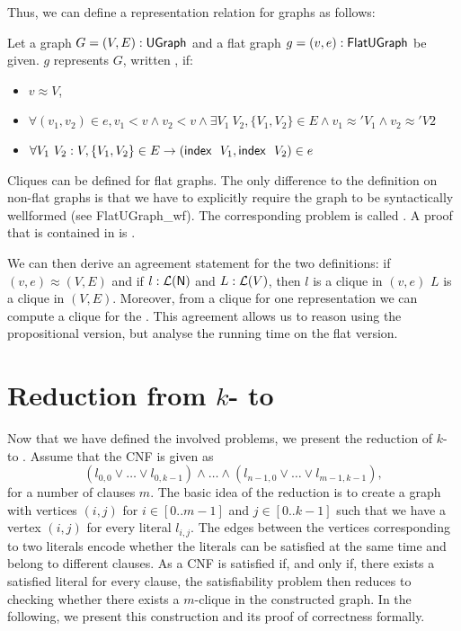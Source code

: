 Thus, we can define a representation relation for graphs as follows: 
\begin{definition}\label{def:graph_repr}
  Let a graph $G = (V, E) : \textsf{UGraph}$ and a flat graph $g = (v, e) : \textsf{FlatUGraph}$ be given. 
  $g$ represents $G$, written , if: 
  \begin{itemize}
    \item $v \approx V$, 
    \item $\forall (v_1, v_2) \in e, v_1 < v \land v_2 < v \land \exists V_1~V_2, \{V_1, V_2\} \in E \land v_1 \approx' V_1 \land v_2 \approx' V2$
    \item $\forall V_1~V_2 : V, \{V_1, V_2\} \in E \rightarrow (\textsf{index}~~V_1, \textsf{index}~~V_2) \in e$
  \end{itemize}
\end{definition}

Cliques can be defined  for flat graphs. 
The only difference to the definition on non-flat graphs is that we have to explicitly require the graph to be syntactically wellformed (see \textsf{FlatUGraph\_wf}). 
The corresponding problem is called \mnotec[FlatClique]{\FlatClique{}}. A proof that \FlatClique{} is contained in \NP{} is .

We can then derive an agreement statement for the two definitions: if $(v, e) \approx (V, E)$ and if $l : \mathcal{L} (\mathsf{N})$ and $L : \mathcal{L} (V)$, then $l$ is a clique in $(v, e)$  $L$ is a clique in $(V, E)$. Moreover, from a clique for one representation we can compute a clique for the  .
This agreement allows us to reason using the propositional version, but analyse the running time on the flat version. 

\section{Reduction from $k$-\SAT{} to \Clique{}}
Now that we have defined the involved problems, we present the reduction of $k$-\SAT{} to \Clique{}. 
Assume that the CNF is given as 
\[(l_{0, 0} \lor \ldots \lor l_{0, k-1}) \land \ldots \land (l_{n-1, 0} \lor \ldots \lor l_{m-1, k-1}), \]
for a number of clauses $m$.
The basic idea of the reduction is to create a graph with vertices $(i, j)$ for $i \in [0..m-1]$ and $j \in [0..k-1]$ such that we have a vertex $(i, j)$ for every literal $l_{i, j}$. The edges between the vertices corresponding to two literals encode whether the literals can be satisfied at the same time and belong to different clauses. As a CNF is satisfied if, and only if, there exists a satisfied literal for every clause, the satisfiability problem then reduces to checking whether there exists a $m$-clique in the constructed graph. 
In the following, we present this construction and its proof of correctness formally.

